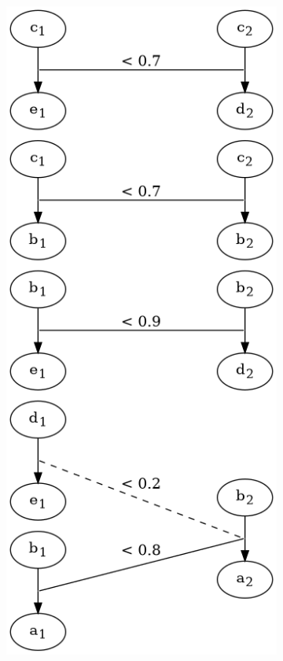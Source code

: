 \begin{frame}
\begin{figure}[htbp]
\begin{subfigure}[t]{0.20\textwidth}
			\centering
			\includegraphics[width=\linewidth,valign=t]{inc/fuzzy_graph_theory/fuzzy_graph_morphism_external_rho_mu.png}

\end{subfigure}
\end{figure}
\end{frame}

